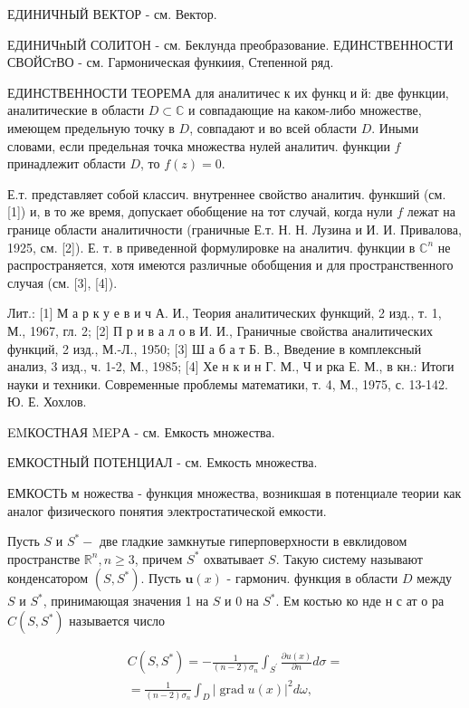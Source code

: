 \documentclass[10pt]{article}
\begin{document}
ЕДИНИЧНЫЙ ВЕКТОР - см. Вектор.



ЕДИНИЧнЫЙ СОЛИТОН - см. Беклунда преобразование. ЕДИНСТВЕННОСТИ СВОЙСтВО - см. Гармоническая функиия, Степенной ряд.



ЕДИНСТВЕННОСТИ ТЕОРЕМА для аналитичес к их функц и й: две функции, аналитические в области $D \subset \mathbb{C}$ и совпадающие на каком-либо множестве, имеющем предельную точку в $D$, совпадают и во всей области $D$. Иными словами, если предельная точка множества нулей аналитич. функции $f$ принадлежит области $D$, то $f(z)=0$.



Е.т. представляет собой классич. внутреннее свойство аналитич. функший (см. [1]) и, в то же время, допускает обобщение на тот случай, когда нули $f$ лежат на границе области аналитичности (граничные Е.т. Н. Н. Лузина и И. И. Привалова, 1925, см. [2]). Е. т. в приведенной формулировке на аналитич. функции в $\mathbb{C}^{n}$ не распространяется, хотя имеются различные обобщения и для пространственного случая (см. [3], [4]).



Лит.: [1] М а р к у е в и ч А. И., Теория аналитических функщий, 2 изд., т. 1, М., 1967, гл. 2; [2] П р и в а л о в И. И., Граничные свойства аналитических функций, 2 изд., М.-Л., 1950; [3] Ш а б а т Б. В., Введение в комплексный анализ, 3 изд., ч. 1-2, М., 1985; [4] Хе н к и н Г. М., Ч и рка Е. М., в кн.: Итоги науки и техники. Современные проблемы математики, т. 4, М., 1975, с. 13-142. Ю. Е. Хохлов.



EMКОСТНАЯ MEPА - см. Емкость множества.



ЕМКОСТНЫЙ ПОТЕНЦИАЛ - см. Емкость множества.



ЕМКОСТЬ м ножества - функция множества, возникшая в потенциале теории как аналог физического понятия электростатической емкости.



Пусть $S$ и $S^{*}-$ две гладкие замкнутые гиперповерхности в евклидовом пространстве $\mathbb{R}^{n}, n \geqslant 3$, причем $S^{*}$ охватывает $S$. Такую систему называют конденсатором $\left(S, S^{*}\right)$. Пусть $\boldsymbol{u}(x)$ - гармонич. функция в области $D$ между $S$ и $S^{*}$, принимающая значения 1 на $S$ и 0 на $S^{*}$. Ем костью ко нде н с ат о ра $C\left(S, S^{*}\right)$ называется число



\[

\begin{gathered}

C\left(S, S^{*}\right)=-\frac{1}{(n-2) \sigma_{n}} \int_{S^{\prime}} \frac{\partial u(x)}{\partial n} d \sigma= \\

=\frac{1}{(n-2) \sigma_{n}} \int_{D}|\operatorname{grad} u(x)|^{2} d \omega,

\end{gathered}

\]
\end{document}
